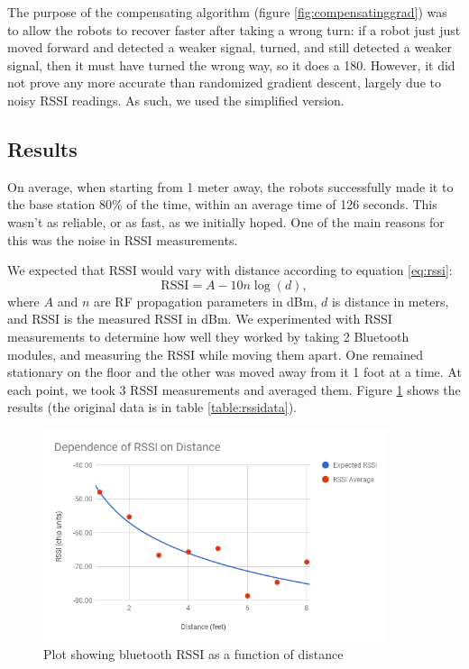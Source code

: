 \documentclass[]{article}
\begin{document}
The purpose of the compensating algorithm (figure \ref{fig:compensatinggrad}) was to allow the robots to recover faster after taking a wrong turn: if a robot just just moved forward and detected a weaker signal, turned, and still detected a weaker signal, then it must have turned the wrong way, so it does a 180.
However, it did not prove any more accurate than randomized gradient descent, largely due to noisy RSSI readings.
As such, we used the simplified version.

\subsection{Results}

On average, when starting from 1 meter away, the robots successfully made it to the base station 80\% of the time,
within an average time of 126 seconds.
This wasn't as reliable, or as fast, as we initially hoped.
One of the main reasons for this was the noise in RSSI measurements.

We expected that RSSI would vary with distance according to equation \ref{eq:rssi}:
\begin{equation} \label{eq:rssi}
  \text{RSSI} = A - 10 n \log(d),
\end{equation}
where $A$ and $n$ are RF propagation parameters in dBm, $d$ is distance in meters, and RSSI is the measured RSSI in dBm. \cite{5415423}
We experimented with RSSI measurements to determine how well they worked by taking 2 Bluetooth modules, and measuring the RSSI while moving them apart.
One remained stationary on the floor and the other was moved away from it 1 foot at a time.
At each point, we took 3 RSSI measurements and averaged them. Figure \ref{fig:rssiplot} shows the results (the original data is in table \ref{table:rssidata}).

\begin{figure}
  \centering
  \includegraphics[width=0.9\textwidth]{rssi-chart.png}
  \caption{Plot showing bluetooth RSSI as a function of distance}
  \label{fig:rssiplot}
\end{figure}
\end{document}
